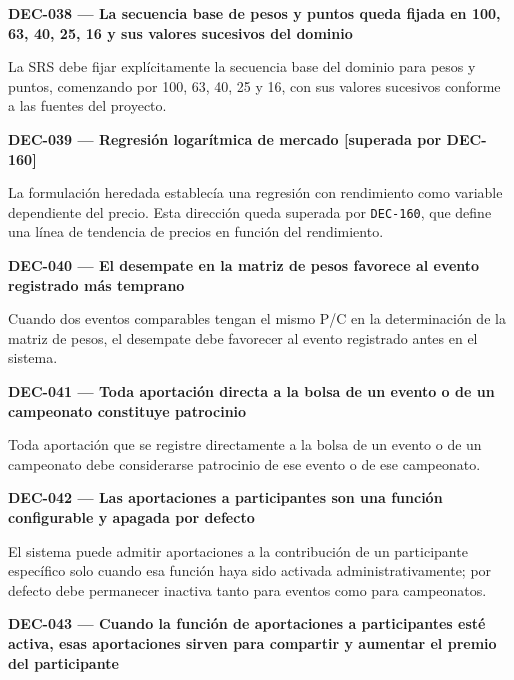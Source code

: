 \documentclass[10pt,letterpaper]{article}
\begin{document}
\noindent\textbf{DEC-038 --- La secuencia base de pesos y puntos queda fijada en 100, 63, 40, 25, 16 y sus valores sucesivos del dominio}\par
La SRS debe fijar explícitamente la secuencia base del dominio para pesos y puntos, comenzando por 100, 63, 40, 25 y 16, con sus valores sucesivos conforme a las fuentes del proyecto.\par\vspace{0.45em}
\noindent\textbf{DEC-039 --- Regresión logarítmica de mercado [superada por DEC-160]}\par
La formulación heredada establecía una regresión con rendimiento como variable dependiente del precio. Esta dirección queda superada por \texttt{DEC-160}, que define una línea de tendencia de precios en función del rendimiento.\par\vspace{0.45em}
\noindent\textbf{DEC-040 --- El desempate en la matriz de pesos favorece al evento registrado más temprano}\par
Cuando dos eventos comparables tengan el mismo P/C en la determinación de la matriz de pesos, el desempate debe favorecer al evento registrado antes en el sistema.\par\vspace{0.45em}
\noindent\textbf{DEC-041 --- Toda aportación directa a la bolsa de un evento o de un campeonato constituye patrocinio}\par
Toda aportación que se registre directamente a la bolsa de un evento o de un campeonato debe considerarse patrocinio de ese evento o de ese campeonato.\par\vspace{0.45em}
\noindent\textbf{DEC-042 --- Las aportaciones a participantes son una función configurable y apagada por defecto}\par
El sistema puede admitir aportaciones a la contribución de un participante específico solo cuando esa función haya sido activada administrativamente; por defecto debe permanecer inactiva tanto para eventos como para campeonatos.\par\vspace{0.45em}
\noindent\textbf{DEC-043 --- Cuando la función de aportaciones a participantes esté activa, esas aportaciones sirven para compartir y aumentar el premio del participante}\par
\end{document}
